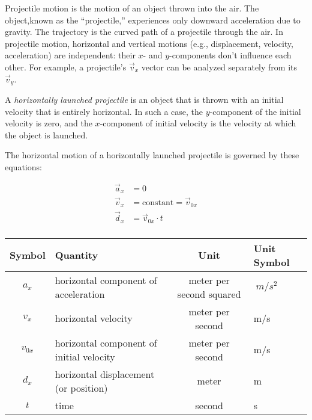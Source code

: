 \documentclass[main-physics.tex]{subfiles}
\begin{document}
Projectile motion is the motion of an object thrown into the air. The object,known as the ``projectile,'' experiences only downward acceleration due to gravity. The trajectory is the curved path of a projectile through the air. In projectile motion, horizontal and vertical motions (e.g., displacement, velocity, acceleration) are independent: their $x$- and $y$-components don't influence each other. For example, a projectile's $\vec{v}_x$ vector can be analyzed separately from its $\vec{v}_y$.

A \textit{horizontally launched projectile} is an object that is thrown with an initial velocity that is entirely horizontal. In such a case, the $y$-component of the initial velocity is zero, and the $x$-component of initial velocity is the velocity at which the object is launched. 

\begin{mdframed}[backgroundcolor=black!10]
The horizontal motion of a horizontally launched projectile is governed by these equations:
\vspace{-1em}

\begin{align*}
    \vec{a}_x &= 0\\[0.5ex]
    \vec{v}_x &= \mathrm{constant} = \vec{v}_{0x}\\[0.5ex]
    \vec{d}_x &= \vec{v}_{0x} \cdot t\\[0.5ex]
\end{align*}
\vspace{-3em}

\begin{center}
        \begin{tabular}{cl|cl}
    \hline
    \textbf{Symbol} & \textbf{Quantity} & \textbf{Unit} & \textbf{Unit Symbol}  \\
    \hline\hline
        $a_x$ & horizontal component of acceleration & meter per second squared & $\SI{}{m/s^2}$\\
        $v_x$ & horizontal velocity & meter per second & m/s\\
        $v_{0x}$ & horizontal component of initial velocity & meter per second & m/s\\
        $d_x$ & horizontal displacement (or position) & meter & m\\
        $t$ & time & second & s\\
    \hline
    \end{tabular}
\end{center}
\end{mdframed}
\end{document}
